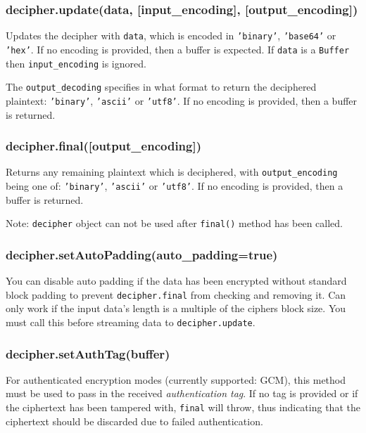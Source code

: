 \subsubsection{decipher.update(data, {[}input\_encoding{]},
{[}output\_encoding{]})}\label{decipher.updatedata-inputux5fencoding-outputux5fencoding}

Updates the decipher with \texttt{data}, which is encoded in
\texttt{'binary'}, \texttt{'base64'} or \texttt{'hex'}. If no encoding
is provided, then a buffer is expected. If \texttt{data} is a
\texttt{Buffer} then \texttt{input\_encoding} is ignored.

The \texttt{output\_decoding} specifies in what format to return the
deciphered plaintext: \texttt{'binary'}, \texttt{'ascii'} or
\texttt{'utf8'}. If no encoding is provided, then a buffer is returned.

\subsubsection{decipher.final({[}output\_encoding{]})}\label{decipher.finaloutputux5fencoding}

Returns any remaining plaintext which is deciphered, with
\texttt{output\_encoding} being one of: \texttt{'binary'},
\texttt{'ascii'} or \texttt{'utf8'}. If no encoding is provided, then a
buffer is returned.

Note: \texttt{decipher} object can not be used after \texttt{final()}
method has been called.

\subsubsection{decipher.setAutoPadding(auto\_padding=true)}\label{decipher.setautopaddingautoux5fpaddingtrue}

You can disable auto padding if the data has been encrypted without
standard block padding to prevent \texttt{decipher.final} from checking
and removing it. Can only work if the input data's length is a multiple
of the ciphers block size. You must call this before streaming data to
\texttt{decipher.update}.

\subsubsection{decipher.setAuthTag(buffer)}\label{decipher.setauthtagbuffer}

For authenticated encryption modes (currently supported: GCM), this
method must be used to pass in the received \emph{authentication tag}.
If no tag is provided or if the ciphertext has been tampered with,
\texttt{final} will throw, thus indicating that the ciphertext should be
discarded due to failed authentication.

